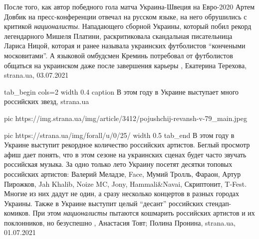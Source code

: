 После того, как автор победного гола матча Украина-Швеция на Евро-2020 Артем
Довбик на пресс-конференции отвечал на русском языке, на него обрушились с
критикой \emph{националисты}.  Нападающего сборной Украины, который побил
рекорд легендарного Мишеля Платини, раскритиковала скандальная писательница
Лариса Ницой, которая и ранее называла украинских футболистов
\enquote{кончеными московитами}. А языковой омбудсмен Креминь потребовал от
футболистов общаться на украинском даже после завершения карьеры
, 
Екатерина Терехова, strana.ua, 03.07.2021

\ifcmt
tab_begin cols=2
	width 0.4
	caption В этом году в Украине выступает много российских звезд, strana.ua

  pic https://img.strana.ua/img/article/3412/pojushchij-revansh-v-79_main.jpeg

	pic https://strana.ua/img/forall/u/0/25/%
	width 0.5
tab_end
\fi
В этом году в Украине выступит рекордное количество российских артистов.
Беглый просмотр афиш дает понять, что в этом сезоне на украинских сценах будет
часто звучать российская музыка. За одно только лето Украину посетят десятки
топовых российских артистов: Валерий Меладзе, Face, Мумий Тролль, Фараон, Артур
Пирожков, Jah Khalib, Noize MC, Jony, Hammali\&Navai, Скриптонит, T-Fest.
Многие из них дадут не один, а сразу несколько концертов в разных городах
Украины.  Также в Украине выступит целый \enquote{десант} российских стендап-комиков.
При этом \emph{националисты} пытаются кошмарить российских артистов и их поклонников,
но безуспешно
, 
Анастасия Товт; Полина Пронина, strana.ua, 01.07.2021

